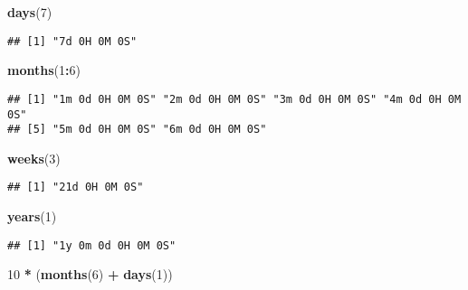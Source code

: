 \documentclass[
]{article}
\newenvironment{Shaded}{\begin{snugshade}}{\end{snugshade}}
\newcommand{\DecValTok}[1]{\textcolor[rgb]{0.00,0.00,0.81}{#1}}
\newcommand{\FunctionTok}[1]{\textcolor[rgb]{0.13,0.29,0.53}{\textbf{#1}}}
\newcommand{\NormalTok}[1]{#1}
\newcommand{\SpecialCharTok}[1]{\textcolor[rgb]{0.81,0.36,0.00}{\textbf{#1}}}
\begin{document}
\begin{Shaded}
\begin{Highlighting}[]
\FunctionTok{days}\NormalTok{(}\DecValTok{7}\NormalTok{)}
\end{Highlighting}
\end{Shaded}

\begin{verbatim}
## [1] "7d 0H 0M 0S"
\end{verbatim}

\begin{Shaded}
\begin{Highlighting}[]
\FunctionTok{months}\NormalTok{(}\DecValTok{1}\SpecialCharTok{:}\DecValTok{6}\NormalTok{)}
\end{Highlighting}
\end{Shaded}

\begin{verbatim}
## [1] "1m 0d 0H 0M 0S" "2m 0d 0H 0M 0S" "3m 0d 0H 0M 0S" "4m 0d 0H 0M 0S"
## [5] "5m 0d 0H 0M 0S" "6m 0d 0H 0M 0S"
\end{verbatim}

\begin{Shaded}
\begin{Highlighting}[]
\FunctionTok{weeks}\NormalTok{(}\DecValTok{3}\NormalTok{)}
\end{Highlighting}
\end{Shaded}

\begin{verbatim}
## [1] "21d 0H 0M 0S"
\end{verbatim}

\begin{Shaded}
\begin{Highlighting}[]
\FunctionTok{years}\NormalTok{(}\DecValTok{1}\NormalTok{)}
\end{Highlighting}
\end{Shaded}

\begin{verbatim}
## [1] "1y 0m 0d 0H 0M 0S"
\end{verbatim}

\begin{Shaded}
\begin{Highlighting}[]
\DecValTok{10} \SpecialCharTok{*}\NormalTok{ (}\FunctionTok{months}\NormalTok{(}\DecValTok{6}\NormalTok{) }\SpecialCharTok{+} \FunctionTok{days}\NormalTok{(}\DecValTok{1}\NormalTok{))}
\end{Highlighting}
\end{Shaded}
\end{document}
